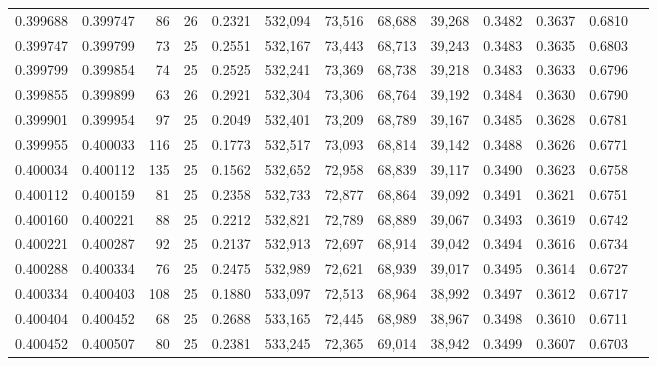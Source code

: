 \begin{tabular}{rrrrrrrrrrrrr}
0.399688 & 0.399747 &    86 &  26 &                                     0.2321 & 532,094 &  73,516 &  68,688 &  39,268 & 0.3482 & 0.3637 & 0.6810 \\
0.399747 & 0.399799 &    73 &  25 &                                     0.2551 & 532,167 &  73,443 &  68,713 &  39,243 & 0.3483 & 0.3635 & 0.6803 \\
0.399799 & 0.399854 &    74 &  25 &                                     0.2525 & 532,241 &  73,369 &  68,738 &  39,218 & 0.3483 & 0.3633 & 0.6796 \\
0.399855 & 0.399899 &    63 &  26 &                                     0.2921 & 532,304 &  73,306 &  68,764 &  39,192 & 0.3484 & 0.3630 & 0.6790 \\
0.399901 & 0.399954 &    97 &  25 &                                     0.2049 & 532,401 &  73,209 &  68,789 &  39,167 & 0.3485 & 0.3628 & 0.6781 \\
0.399955 & 0.400033 &   116 &  25 &                                     0.1773 & 532,517 &  73,093 &  68,814 &  39,142 & 0.3488 & 0.3626 & 0.6771 \\
0.400034 & 0.400112 &   135 &  25 &                                     0.1562 & 532,652 &  72,958 &  68,839 &  39,117 & 0.3490 & 0.3623 & 0.6758 \\
0.400112 & 0.400159 &    81 &  25 &                                     0.2358 & 532,733 &  72,877 &  68,864 &  39,092 & 0.3491 & 0.3621 & 0.6751 \\
0.400160 & 0.400221 &    88 &  25 &                                     0.2212 & 532,821 &  72,789 &  68,889 &  39,067 & 0.3493 & 0.3619 & 0.6742 \\
0.400221 & 0.400287 &    92 &  25 &                                     0.2137 & 532,913 &  72,697 &  68,914 &  39,042 & 0.3494 & 0.3616 & 0.6734 \\
0.400288 & 0.400334 &    76 &  25 &                                     0.2475 & 532,989 &  72,621 &  68,939 &  39,017 & 0.3495 & 0.3614 & 0.6727 \\
0.400334 & 0.400403 &   108 &  25 &                                     0.1880 & 533,097 &  72,513 &  68,964 &  38,992 & 0.3497 & 0.3612 & 0.6717 \\
0.400404 & 0.400452 &    68 &  25 &                                     0.2688 & 533,165 &  72,445 &  68,989 &  38,967 & 0.3498 & 0.3610 & 0.6711 \\
0.400452 & 0.400507 &    80 &  25 &                                     0.2381 & 533,245 &  72,365 &  69,014 &  38,942 & 0.3499 & 0.3607 & 0.6703 \\

\end{tabular}
